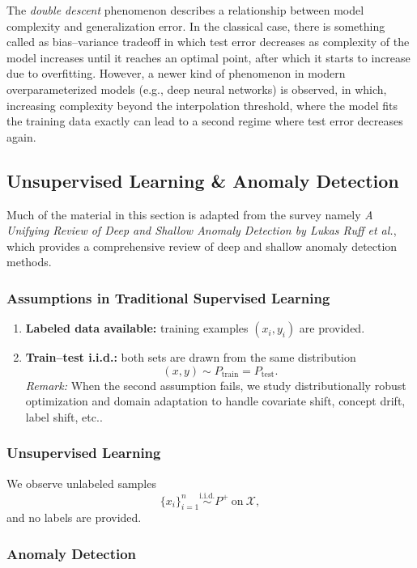 \documentclass[11pt]{article}
\theoremstyle{plain}
\begin{document}
The \textit{double descent} phenomenon describes a relationship between model complexity and generalization error. 
In the classical case, there is something called as bias--variance tradeoff in which test error decreases as complexity of the model increases until it reaches an optimal point, after which it starts to increase due to overfitting.
However, a newer kind of phenomenon in modern overparameterized models (e.g., deep neural networks) is observed, in which, increasing complexity beyond the interpolation threshold, where the model fits the training data exactly can lead to a second regime where test error decreases again. 


\subsection{Unsupervised Learning \& Anomaly Detection}


Much of the material in this section is adapted from the survey namely \emph{A Unifying Review of Deep and Shallow Anomaly Detection by Lukas Ruff et al.}, which provides a comprehensive review of deep and shallow anomaly detection methods.

\subsubsection{Assumptions in Traditional Supervised Learning}
\begin{enumerate}
  \item \textbf{Labeled data available:} training examples $(x_i,y_i)$ are provided.
  \item \textbf{Train--test i.i.d.:} both sets are drawn from the same distribution
  \[
    (x,y)\sim P_{\text{train}}=P_{\text{test}}.
  \]
  \textit{Remark:} When the second assumption fails, we study distributionally
  robust optimization and domain adaptation to handle covariate shift, concept
  drift, label shift, etc..
\end{enumerate}

\subsubsection{Unsupervised Learning}
We observe unlabeled samples
\[
  \{x_i\}_{i=1}^n \stackrel{\text{i.i.d.}}{\sim} P^{+}\ \text{on}\ \mathcal X,
\]
and no labels are provided.

\subsubsection{Anomaly Detection}
\end{document}
